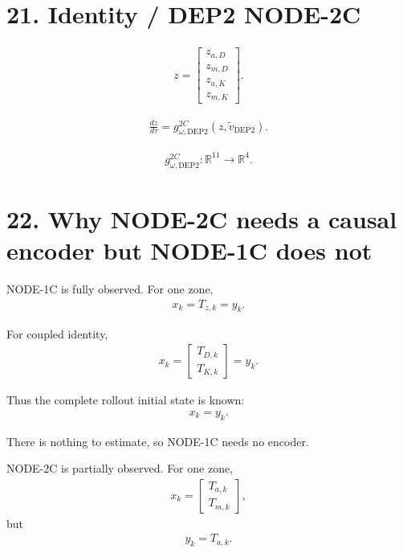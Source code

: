 \documentclass[11pt]{article}
\begin{document}
\section*{21. Identity / DEP2 NODE-2C}

\begin{align}
\boxed{
z=
\begin{bmatrix}
z_{a,D}\\
z_{m,D}\\
z_{a,K}\\
z_{m,K}
\end{bmatrix}.
}
\tag{N3.64}
\end{align}

\begin{align}
\boxed{
\frac{dz}{d\tau}
=
g_{\omega,\mathrm{DEP2}}^{2C}
(z,\widetilde v_{\mathrm{DEP2}}).
}
\tag{N3.65}
\end{align}

\begin{align}
\boxed{
g_{\omega,\mathrm{DEP2}}^{2C}:
\mathbb R^{11}\rightarrow\mathbb R^4.
}
\tag{N3.66}
\end{align}

\section*{22. Why NODE-2C needs a causal encoder but NODE-1C does not}

NODE-1C is fully observed. For one zone,
\begin{align}
\boxed{x_k=T_{z,k}=y_k.}
\tag{N3.67}
\end{align}

For coupled identity,
\begin{align}
\boxed{
x_k=
\begin{bmatrix}
T_{D,k}\\
T_{K,k}
\end{bmatrix}
=y_k.
}
\tag{N3.68}
\end{align}

Thus the complete rollout initial state is known:
\begin{align}
\boxed{x_k=y_k.}
\tag{N3.69}
\end{align}

There is nothing to estimate, so NODE-1C needs no encoder.

NODE-2C is partially observed. For one zone,
\begin{align}
\boxed{
x_k=
\begin{bmatrix}
T_{a,k}\\
T_{m,k}
\end{bmatrix},
}
\tag{N3.70}
\end{align}
but
\begin{align}
\boxed{y_k=T_{a,k}.}
\tag{N3.71}
\end{align}
\end{document}
